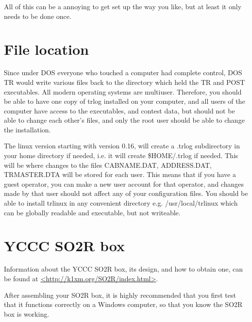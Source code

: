 \documentclass[12pt]{article}
\begin{document}
All of this can be a annoying to get set up the way you like, but at
least it only needs to be done once.

\section{File location}
Since under DOS everyone who touched a computer had complete control, DOS
TR would write various files back to the directory which held the TR and POST
executables. All modern operating systems are multiuser. Therefore,
you should be able to have one copy of trlog installed on your computer,
and all users of the computer have access to the executables, and contest
data, but should not be able to change each other's files, and only
the root user should be able to change the installation.

The linux version starting with version 0.16, will create a .trlog subdirectory
in your home directory if needed, i.e. it will create \$HOME/.trlog if
needed. This will be where changes to
the files CABNAME.DAT, ADDRESS.DAT, TRMASTER.DTA will be stored for each
user. This means that if you have a guest operator, you can make a new
user account for that operator, and changes made by that user should not
affect any of your configuration files. You should be able to install
trlinux in any convenient directory e.g. /usr/local/trlinux which
can be globally readable and executable, but not writeable.

\section{YCCC SO2R box}
Information about the YCCC SO2R box, its design, and how to obtain
one, can be found at
\url{<http://k1xm.org/SO2R/index.html>}.

After assembling your SO2R box, it is highly recommended that you first
test that it functions correctly on a Windows computer, so that you
know the SO2R box is working.
\end{document}
